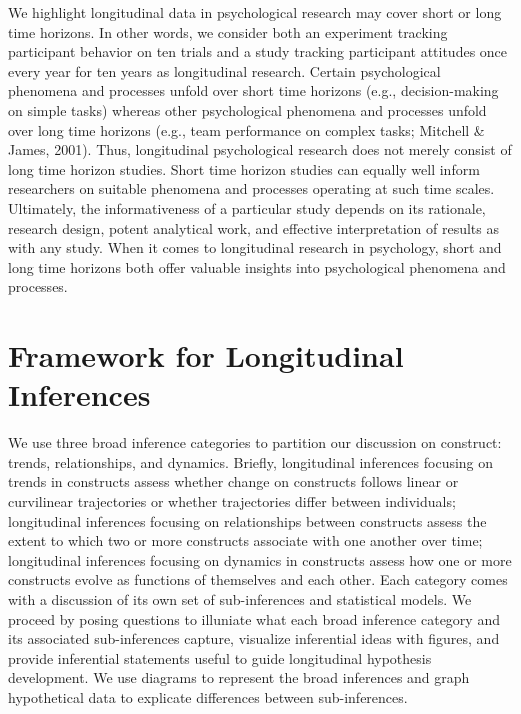 \documentclass[english,,man]{apa6}
\begin{document}
We highlight longitudinal data in psychological research may cover short or long time horizons. In other words, we consider both an experiment tracking participant behavior on ten trials and a study tracking participant attitudes once every year for ten years as longitudinal research. Certain psychological phenomena and processes unfold over short time horizons (e.g., decision-making on simple tasks) whereas other psychological phenomena and processes unfold over long time horizons (e.g., team performance on complex tasks; Mitchell \& James, 2001). Thus, longitudinal psychological research does not merely consist of long time horizon studies. Short time horizon studies can equally well inform researchers on suitable phenomena and processes operating at such time scales. Ultimately, the informativeness of a particular study depends on its rationale, research design, potent analytical work, and effective interpretation of results as with any study. When it comes to longitudinal research in psychology, short and long time horizons both offer valuable insights into psychological phenomena and processes.

\hypertarget{framework-for-longitudinal-inferences}{%
\section{Framework for Longitudinal Inferences}\label{framework-for-longitudinal-inferences}}

We use three broad inference categories to partition our discussion on construct: trends, relationships, and dynamics. Briefly, longitudinal inferences focusing on trends in constructs assess whether change on constructs follows linear or curvilinear trajectories or whether trajectories differ between individuals; longitudinal inferences focusing on relationships between constructs assess the extent to which two or more constructs associate with one another over time; longitudinal inferences focusing on dynamics in constructs assess how one or more constructs evolve as functions of themselves and each other. Each category comes with a discussion of its own set of sub-inferences and statistical models. We proceed by posing questions to illuniate what each broad inference category and its associated sub-inferences capture, visualize inferential ideas with figures, and provide inferential statements useful to guide longitudinal hypothesis development. We use diagrams to represent the broad inferences and graph hypothetical data to explicate differences between sub-inferences.
\end{document}
